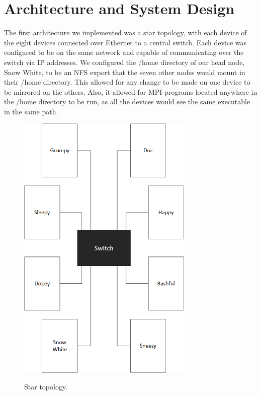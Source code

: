  \section{Architecture and System Design}
The first architecture we implemented was a star topology, with each device of the eight devices connected over Ethernet to a central switch. Each device was configured to be on the same network and capable of communicating over the switch via IP addresses. We configured the /home directory of our head node, Snow White, to be an NFS export that the seven other nodes would mount in their /home directory. This allowed for any change to be made on one device to be mirrored on the others. Also, it allowed for MPI programs located anywhere in the /home directory to be run, as all the devices would see the same executable in the same path. \\

\begin{figure}[tbh]
	\caption{Star topology.}
	\centering
		\includegraphics[width=0.75\textwidth]{cluster_star.png}
	\label{fig:star}
\end{figure}

